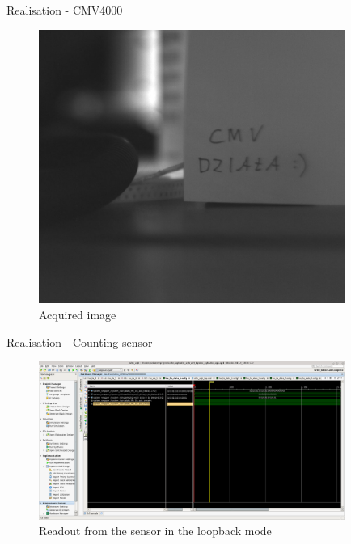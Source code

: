 \documentclass[10pt]{beamer}
\begin{document}
    \begin{frame}{Realisation - CMV4000}
        \begin{figure}[H]
            \centering
            \includegraphics[width=10cm]{pic/test-0.jpg}
            \caption{Acquired image}
        \end{figure}
    \end{frame}

    \begin{frame}{Realisation - Counting sensor}
        \begin{figure}[H]
            \centering
            \includegraphics[width=10cm]{pic/out_get_fd.png}
            \caption{Readout from the sensor in the loopback mode}
        \end{figure}
    \end{frame}
\end{document}
